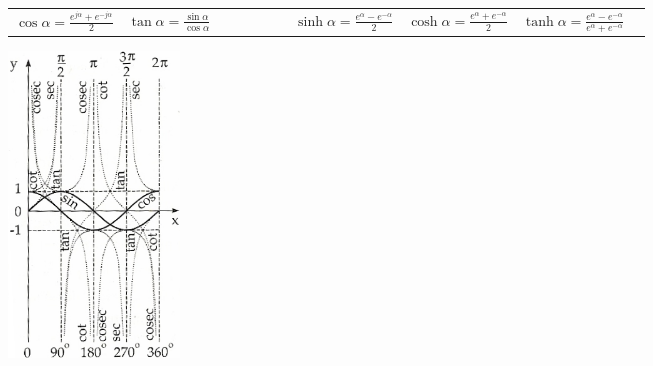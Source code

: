 \begin{minipage}{10.5cm}
\begin{tabular}{lllllll}
      $\cos{\alpha} = \frac{e^{j\alpha} + e^{-j\alpha}}{2}$ &
      
      $\tan{\alpha} = \frac{\sin \alpha}{\cos \alpha}$ &
      
      $ \qquad \qquad $ &
      
      $\sinh{\alpha} = \frac{e^\alpha - e^{-\alpha}}{2} $ &
      
      $\cosh{\alpha} = \frac{e^\alpha + e^{-\alpha}}{2} $ &
      
      $\tanh{\alpha} = \frac{e^\alpha - e^{-\alpha}}{e^\alpha + e^{-\alpha}}$
    \end{tabular}    
\end{minipage}
\includegraphics[width=0.2\textwidth]{bilder/funktionen_trigo}


